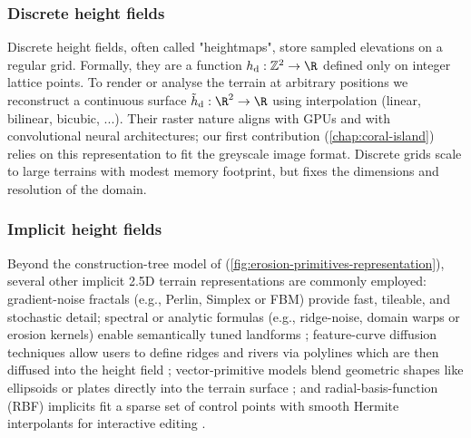 \subsubsection{Discrete height fields}
Discrete height fields, often called "heightmaps", store sampled elevations on a regular grid. Formally, they are a function
$h_{ \text{d}} : \mathbb{Z}^{2} \to \R$ defined only on integer lattice points. To render or analyse the terrain at arbitrary positions we reconstruct a continuous surface $ \tilde{h}_{ \text{d}} : \R^{2} \to \R$
using interpolation (linear, bilinear, bicubic, ...). Their raster nature aligns with GPUs and with convolutional neural architectures; our first contribution (\cref{chap:coral-island}) relies on this representation to fit the greyscale image format. Discrete grids scale to large terrains with modest memory footprint, but fixes the dimensions and resolution of the domain. %

\subsubsection{Implicit height fields}

Beyond the construction-tree model of \cite{Genevaux2015} (\cref{fig:erosion-primitives-representation}), several other implicit 2.5D terrain representations are commonly employed: gradient-noise fractals (e.g., Perlin, Simplex or FBM) provide fast, tileable, and stochastic detail; spectral or analytic formulas (e.g., ridge-noise, domain warps or erosion kernels) enable semantically tuned landforms ; feature-curve diffusion techniques allow users to define ridges and rivers via polylines which are then diffused into the height field ; vector-primitive models blend geometric shapes like ellipsoids or plates directly into the terrain surface ; and radial-basis-function (RBF) implicits fit a sparse set of control points with smooth Hermite interpolants for interactive editing .

